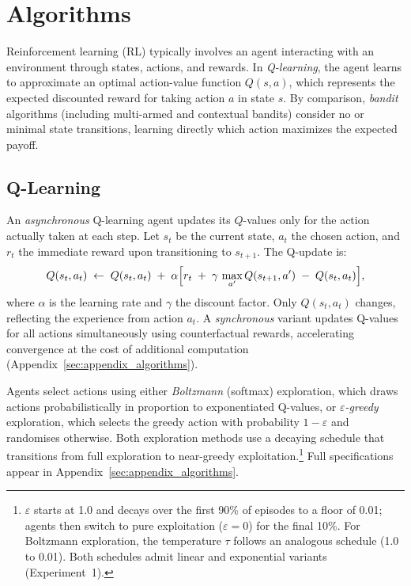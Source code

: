 \section{Algorithms}
\label{sec:algorithms}

Reinforcement learning (RL) typically involves an agent interacting with an environment through states, actions, and rewards. In \emph{Q-learning}, the agent learns to approximate an optimal action-value function $Q(s,a)$, which represents the expected discounted reward for taking action $a$ in state $s$. By comparison, \emph{bandit} algorithms (including multi-armed and contextual bandits) consider no or minimal state transitions, learning directly which action maximizes the expected payoff.

\subsection{Q-Learning}

An \emph{asynchronous} Q-learning agent updates its $Q$-values only for the action actually taken at each step. Let $s_t$ be the current state, $a_t$ the chosen action, and $r_t$ the immediate reward upon transitioning to $s_{t+1}$. The Q-update is:
\begin{equation}
Q(s_t,a_t)
\;\leftarrow\;
Q(s_t,a_t)
\;+\;
\alpha \Bigl[
  r_t
  \;+\;
  \gamma \,\max_{a'} Q(s_{t+1},a')
  \;-\;
  Q(s_t,a_t)
\Bigr],
\label{eq:qlearning_async}
\end{equation}
where $\alpha$ is the learning rate and $\gamma$ the discount factor. Only $Q(s_t,a_t)$ changes, reflecting the experience from action $a_t$. A \emph{synchronous} variant updates Q-values for all actions simultaneously using counterfactual rewards, accelerating convergence at the cost of additional computation (Appendix~\ref{sec:appendix_algorithms}).

Agents select actions using either \emph{Boltzmann} (softmax) exploration, which draws actions probabilistically in proportion to exponentiated Q-values, or \emph{$\varepsilon$-greedy} exploration, which selects the greedy action with probability $1-\varepsilon$ and randomises otherwise. Both exploration methods use a decaying schedule that transitions from full exploration to near-greedy exploitation.\footnote{$\varepsilon$ starts at 1.0 and decays over the first 90\% of episodes to a floor of 0.01; agents then switch to pure exploitation ($\varepsilon = 0$) for the final 10\%. For Boltzmann exploration, the temperature $\tau$ follows an analogous schedule (1.0 to 0.01). Both schedules admit linear and exponential variants (Experiment~1).} Full specifications appear in Appendix~\ref{sec:appendix_algorithms}.

